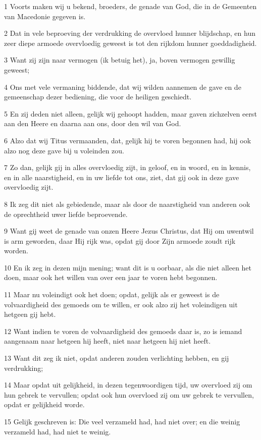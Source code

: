 \par 1 Voorts maken wij u bekend, broeders, de genade van God, die in de Gemeenten van Macedonie gegeven is.
\par 2 Dat in vele beproeving der verdrukking de overvloed hunner blijdschap, en hun zeer diepe armoede overvloedig geweest is tot den rijkdom hunner goeddadigheid.
\par 3 Want zij zijn naar vermogen (ik betuig het), ja, boven vermogen gewillig geweest;
\par 4 Ons met vele vermaning biddende, dat wij wilden aannemen de gave en de gemeenschap dezer bediening, die voor de heiligen geschiedt.
\par 5 En zij deden niet alleen, gelijk wij gehoopt hadden, maar gaven zichzelven eerst aan den Heere en daarna aan ons, door den wil van God.
\par 6 Alzo dat wij Titus vermaanden, dat, gelijk hij te voren begonnen had, hij ook alzo nog deze gave bij u voleinden zou.
\par 7 Zo dan, gelijk gij in alles overvloedig zijt, in geloof, en in woord, en in kennis, en in alle naarstigheid, en in uw liefde tot ons, ziet, dat gij ook in deze gave overvloedig zijt.
\par 8 Ik zeg dit niet als gebiedende, maar als door de naarstigheid van anderen ook de oprechtheid uwer liefde beproevende.
\par 9 Want gij weet de genade van onzen Heere Jezus Christus, dat Hij om uwentwil is arm geworden, daar Hij rijk was, opdat gij door Zijn armoede zoudt rijk worden.
\par 10 En ik zeg in dezen mijn mening; want dit is u oorbaar, als die niet alleen het doen, maar ook het willen van over een jaar te voren hebt begonnen.
\par 11 Maar nu voleindigt ook het doen; opdat, gelijk als er geweest is de volvaardigheid des gemoeds om te willen, er ook alzo zij het voleindigen uit hetgeen gij hebt.
\par 12 Want indien te voren de volvaardigheid des gemoeds daar is, zo is iemand aangenaam naar hetgeen hij heeft, niet naar hetgeen hij niet heeft.
\par 13 Want dit zeg ik niet, opdat anderen zouden verlichting hebben, en gij verdrukking;
\par 14 Maar opdat uit gelijkheid, in dezen tegenwoordigen tijd, uw overvloed zij om hun gebrek te vervullen; opdat ook hun overvloed zij om uw gebrek te vervullen, opdat er gelijkheid worde.
\par 15 Gelijk geschreven is: Die veel verzameld had, had niet over; en die weinig verzameld had, had niet te weinig.
